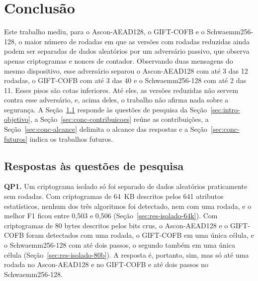 \chapter{Conclusão}
\label{cap:conclusao}

Este trabalho mediu, para o Ascon-AEAD128, o GIFT-COFB e o Schwaemm256-128, o maior número de rodadas em que as versões com rodadas reduzidas ainda podem ser separadas de dados aleatórios por um adversário passivo, que observa apenas criptogramas e nonces de contador. Observando duas mensagens do mesmo dispositivo, esse adversário separou o Ascon-AEAD128 com até 3 das 12 rodadas, o GIFT-COFB com até 3 das 40 e o Schwaemm256-128 com até 2 das 11. Esses pisos são cotas inferiores. Até eles, as versões reduzidas não servem contra esse adversário, e, acima deles, o trabalho não afirma nada sobre a segurança. A Seção~\ref{sec:conc-respostas} responde às questões de pesquisa da Seção~\ref{sec:intro-objetivo}, a Seção~\ref{sec:conc-contribuicoes} reúne as contribuições, a Seção~\ref{sec:conc-alcance} delimita o alcance das respostas e a Seção~\ref{sec:conc-futuros} indica os trabalhos futuros.

\section{Respostas às questões de pesquisa}
\label{sec:conc-respostas}

\textbf{QP1.} Um criptograma isolado só foi separado de dados aleatórios praticamente sem rodadas. Com criptogramas de 64~KB descritos pelos 641 atributos estatísticos, nenhum dos três algoritmos foi detectado, nem com uma rodada, e o melhor F1 ficou entre 0,503 e 0,506 (Seção~\ref{sec:res-isolado-64k}). Com criptogramas de 80 bytes descritos pelos bits crus, o Ascon-AEAD128 e o GIFT-COFB foram detectados com uma rodada, o GIFT-COFB em uma única célula, e o Schwaemm256-128 com até dois passos, o segundo também em uma única célula (Seção~\ref{sec:res-isolado-80b}). A resposta é, portanto, sim, mas só até uma rodada no Ascon-AEAD128 e no GIFT-COFB e até dois passos no Schwaemm256-128.

